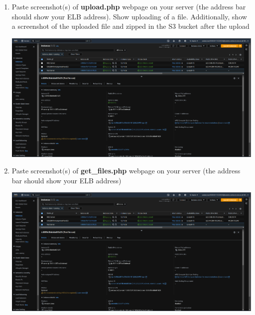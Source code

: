 \documentclass[11pt]{article}
\begin{document}
\begin{enumerate}[resume]
    
    \item Paste screenshot$($s$)$ of \textbf{upload.php} webpage 
    on your server (the address bar should show your ELB address).
    Show uploading of a file. Additionally, show a screenshot of the uploaded file and 
    zipped in the S3 bucket after the upload
    
    \vspace{-0.02mm}

    {\centering
    \includegraphics[width=5.8in]{pics/40.png}
    }    
    
    
    \item Paste screenshot$($s$)$ of \textbf{get\_files.php} webpage on your server (the address bar should show your ELB address)
    
    
    \vspace{-0.02mm}

    {\centering
    \includegraphics[width=5.8in]{pics/40.png}
    }    




\end{enumerate}
\end{document}
